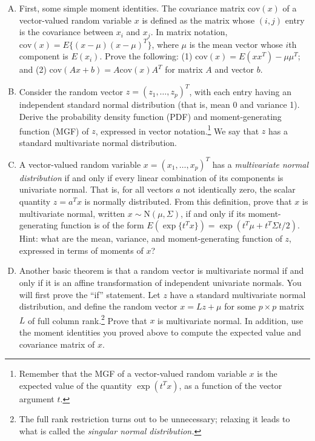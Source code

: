 \documentclass{mynotes}
\newcommand{\N}{\mbox{N}}
\begin{document}
\begin{enumerate}[(A)]

\item First, some simple moment identities.  The covariance matrix $\mbox{cov}(x)$ of a vector-valued random variable $x$ is defined as the matrix whose $(i,j)$ entry is the covariance between $x_i$ and $x_j$.  In matrix notation, $\mbox{cov}(x) = E\{ (x - \mu) (x - \mu)^T \}$, where $\mu$ is the mean vector whose $i$th component is $E(x_i)$.  Prove the following: (1) $\mbox{cov}(x) = E(xx^T) - \mu \mu^T$; and (2) $\mbox{cov}(Ax + b) = A \mbox{cov}(x) A^T$ for matrix $A$ and vector $b$.

\item Consider the random vector $z = (z_1, \ldots, z_p)^T$, with each entry having an independent standard normal distribution (that is, mean 0 and variance 1).  Derive the probability density function (PDF) and moment-generating function (MGF) of $z$, expressed in vector notation.\footnote{Remember that the MGF of a vector-valued random variable $x$ is the expected value of the quantity $\exp(t^T x)$, as a function of the vector argument $t$.}   We say that $z$ has a standard multivariate normal distribution.

\item A vector-valued random variable $x = (x_1, \ldots, x_p)^T$ has a \textit{multivariate normal distribution} if and only if every linear combination of its components is univariate normal.  That is, for all vectors $a$ not identically zero, the scalar quantity $z = a^T x$ is normally distributed.  From this definition, prove that $x$ is multivariate normal, written $x \sim \N(\mu, \Sigma)$, if and only if its moment-generating function is of the form $E(\exp \{t^T x\}) = \exp(t^T \mu + t^T \Sigma t / 2)$.  Hint: what are the mean, variance, and moment-generating function of $z$, expressed in terms of moments of $x$?

\item Another basic theorem is that a random vector is multivariate normal if and only if it is an affine transformation of independent univariate normals.  You will first prove the ``if'' statement.  Let $z$ have a standard multivariate normal distribution, and define the random vector $x = L z + \mu$ for some $p \times p$ matrix $L$ of full column rank.\footnote{The full rank restriction turns out to be unnecessary; relaxing it leads to what is called the \textit{singular normal distribution.}}   Prove that $x$ is multivariate normal.  In addition, use the moment identities you proved above to compute the expected value and covariance matrix of $x$.  


\end{enumerate}
\end{document}
